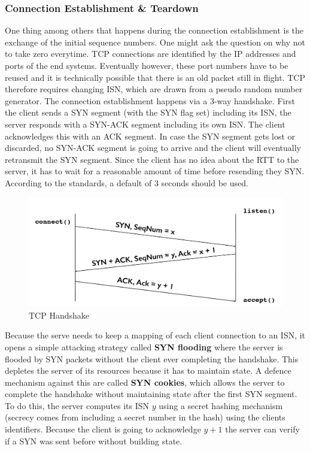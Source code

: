 \subsubsection{Connection Establishment \& Teardown}
One thing among others that happens during the connection establishment is the exchange of the initial sequence numbers. One might ask the question on why not to take zero everytime. TCP connections are identified by the IP addresses and ports of the end systems. Eventually however, these port numbers have to be reused and it is technically possible that there is an old packet still in flight. TCP therefore requires changing ISN, which are drawn from a pseudo random number generator. The connection establishment happens via a 3-way handshake. First the client sends a SYN segment (with the SYN flag set) including its ISN, the server responds with a SYN-ACK segment including its own ISN. The client acknowledges this with an ACK segment. In case the SYN segment gets lost or discarded, no SYN-ACK segment is going to arrive and the client will eventually retransmit the SYN segment. Since the client has no idea about the RTT to the server, it has to wait for a reasonable amount of time before resending they SYN. According to the standards, a default of 3 seconds should be used.
\begin{figure}[H]
\centering
\includegraphics[width=.6\textwidth]{images/tcp_handshake.PNG}
\caption{TCP Handshake}
\label{tcp_handshake}
\end{figure}
Because the serve needs to keep a mapping of each client connection to an ISN, it opens a simple attacking strategy called \textbf{SYN flooding} where the server is flooded by SYN packets without the client ever completing the handshake. This depletes the server of its resources because it has to maintain state. A defence mechanism against this are called \textbf{SYN cookies}, which allows the server to complete the handshake without maintaining state after the first SYN segment. To do this, the server computes its ISN $y$ using a secret hashing mechanism (secrecy comes from including a secret number in the hash) using the clients identifiers. Because the client is going to acknowledge $y + 1$ the server can verify if a SYN was sent before without building state. \vspace{.3cm}\\

